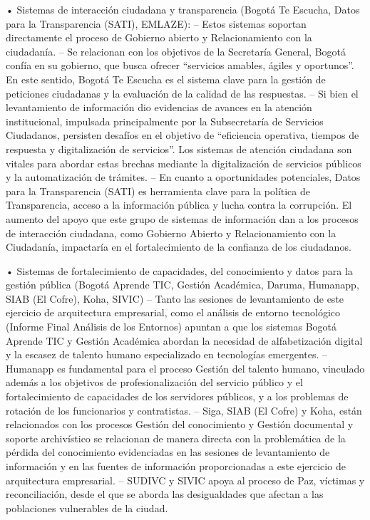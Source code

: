 \documentclass[
	a4paper, %
	12pt, %
]{include/CSSullivanBusinessReport}
\begin{document}
• Sistemas de interacción ciudadana y transparencia (Bogotá Te Escucha,
Datos para la Transparencia (SATI), EMLAZE): -- Estos sistemas soportan
directamente el proceso de Gobierno abierto y Relacionamiento con la
ciudadanía. -- Se relacionan con los objetivos de la Secretaría General,
Bogotá confía en su gobierno, que busca ofrecer ``servicios amables,
ágiles y oportunos''. En este sentido, Bogotá Te Escucha es el sistema
clave para la gestión de peticiones ciudadanas y la evaluación de la
calidad de las respuestas. -- Si bien el levantamiento de información
dio evidencias de avances en la atención institucional, impulsada
principalmente por la Subsecretaría de Servicios Ciudadanos, persisten
desafíos en el objetivo de ``eficiencia operativa, tiempos de respuesta
y digitalización de servicios''. Los sistemas de atención ciudadana son
vitales para abordar estas brechas mediante la digitalización de
servicios públicos y la automatización de trámites. -- En cuanto a
oportunidades potenciales, Datos para la Transparencia (SATI) es
herramienta clave para la política de Transparencia, acceso a la
información pública y lucha contra la corrupción. El aumento del apoyo
que este grupo de sistemas de información dan a los procesos de
interacción ciudadana, como Gobierno Abierto y Relacionamiento con la
Ciudadanía, impactaría en el fortalecimiento de la confianza de los
ciudadanos.

• Sistemas de fortalecimiento de capacidades, del conocimiento y datos
para la gestión pública (Bogotá Aprende TIC, Gestión Académica, Daruma,
Humanapp, SIAB (El Cofre), Koha, SIVIC) -- Tanto las sesiones de
levantamiento de este ejercicio de arquitectura empresarial, como el
análisis de entorno tecnológico (Informe Final Análisis de los Entornos)
apuntan a que los sistemas Bogotá Aprende TIC y Gestión Académica
abordan la necesidad de alfabetización digital y la escasez de talento
humano especializado en tecnologías emergentes. -- Humanapp es
fundamental para el proceso Gestión del talento humano, vinculado además
a los objetivos de profesionalización del servicio público y el
fortalecimiento de capacidades de los servidores públicos, y a los
problemas de rotación de los funcionarios y contratistas. -- Siga, SIAB
(El Cofre) y Koha, están relacionados con los procesos Gestión del
conocimiento y Gestión documental y soporte archivístico se relacionan
de manera directa con la problemática de la pérdida del conocimiento
evidenciadas en las sesiones de levantamiento de información y en las
fuentes de información proporcionadas a este ejercicio de arquitectura
empresarial. -- SUDIVC y SIVIC apoya al proceso de Paz, víctimas y
reconciliación, desde el que se aborda las desigualdades que afectan a
las poblaciones vulnerables de la ciudad.
\end{document}
